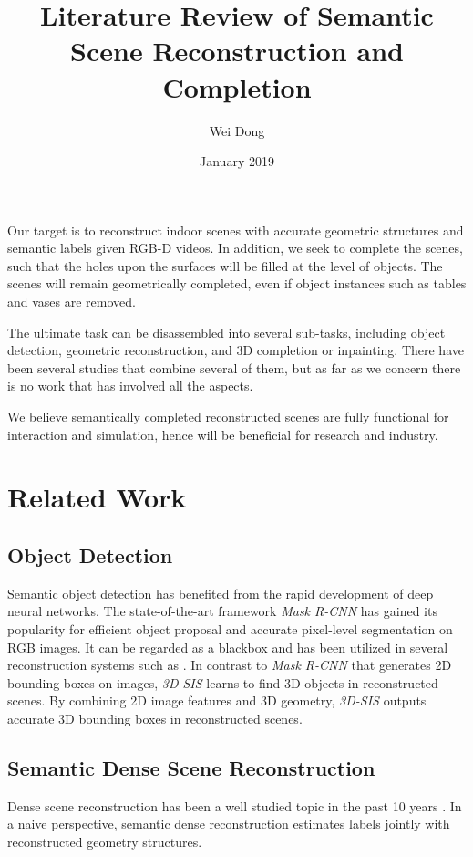 \documentclass{article}
\title{Literature Review of Semantic Scene Reconstruction and Completion}
\author{Wei Dong}
\date{January 2019}
\begin{document}
\maketitle

Our target is to reconstruct indoor scenes with accurate geometric structures
and semantic labels given RGB-D videos.
In addition, we seek to complete the scenes, such that the holes upon the
surfaces will be filled at the level of objects.
The scenes will remain geometrically completed, even if object instances such
as tables and vases are removed.

The ultimate task can be disassembled into several sub-tasks, including
object detection, geometric reconstruction, and 3D completion or inpainting.
There have been several studies that combine several of them, but as far as
we concern there is no work that has involved all the aspects.

We believe semantically completed reconstructed scenes are fully functional for
interaction and simulation, hence will be beneficial for research and industry.

\section{Related Work}
\subsection{Object Detection}
Semantic object detection has benefited from the rapid development of deep
neural networks. The state-of-the-art framework \textit{Mask R-CNN}
\cite{He-et-al-ICCV-2017} has gained its popularity for efficient object
proposal and accurate pixel-level segmentation on RGB images. It can be
regarded as a blackbox and has been utilized in several reconstruction
systems such as \cite{McCormac-et-al-3DV-2018, Runz-and-Agapito-ISMAR-2018}.
In contrast to \textit{Mask R-CNN} that generates 2D bounding boxes on images,
\textit{3D-SIS} \cite{Ji-et-al-arxiv-2018} learns to find 3D objects
in reconstructed scenes. By combining 2D image features and 3D geometry,
\textit{3D-SIS} outputs accurate 3D bounding boxes in reconstructed scenes.

\subsection{Semantic Dense Scene Reconstruction}
Dense scene reconstruction has been a well studied topic in the past 10 years
\cite{Newcombe-et-al-ISMAR-2011, Niessner-et-al-TOG-2013,
Whelan-et-al-RAS-2012, Dai-et-al-TOG-2017}. In a naive perspective,
semantic dense reconstruction estimates labels jointly with reconstructed
geometry structures.
\end{document}
